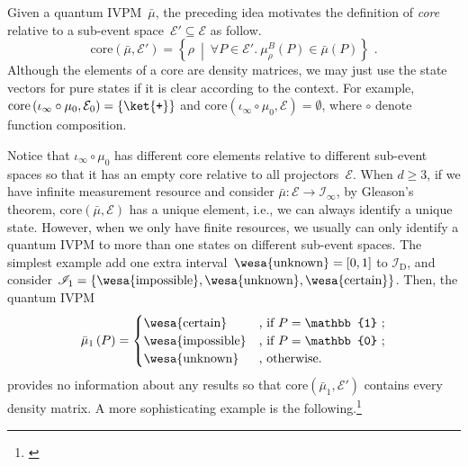 \documentclass[english,reprint, aps, prl,superscriptaddress, showpacs,
showkeys, longbibliography, amsmath, amssymb]{revtex4-1}
\theoremstyle{plain}
\theoremstyle{definition}
\newcommand{\events}{\ensuremath{\mathcal{E}}}
\newcommand{\imposs}{{\text{\wesa{impossible}}}}
\newcommand{\necess}{{\text{\wesa{certain}}}}
\newcommand{\unknown}{{\text{\wesa{unknown}}}}
\newcommand{\ps}{\texttt{+}}
\newcommand{\yutsung}[1]{\begin{framed}\begin{minipage}{0.9\linewidth}\color{purple}{Yu-Tsung says: #1}\end{minipage}\end{framed}}
\newcommand{\set}[2]{\ensuremath{\left\{ {#1}~\middle|~{#2}\right\} }}
\begin{document}
Given a quantum IVPM~$\bar{\mu}$, the preceding idea motivates the
definition of \emph{core} relative to a sub-event space~$\events'\subseteq\events$
as follow.
\begin{equation}
\mathrm{core}\left(\bar{\mu},\events'\right)=\set{\rho}{\forall P\in\events'.~\mu_{\rho}^{B}\left(P\right)\in\bar{\mu}\left(P\right)}\textrm{ .}
\end{equation}
Although the elements of a core are density matrices, we may just
use the state vectors for pure states if it is clear according to
the context. For example, $\mathrm{core}\left(\iota_{\infty}\circ\mu_{0},\events_{0}\right)=\left\{ \ket{\ps}\right\} $
and $\mathrm{core}\left(\iota_{\infty}\circ\mu_{0},\events\right)=\emptyset$,
where $\circ$ denote function composition.

Notice that $\iota_{\infty}\circ\mu_{0}$ has different core elements
relative to different sub-event spaces so that it has an empty core
relative to all projectors~$\events$. When $d\ge3$, if we have
infinite measurement resource and consider $\bar{\mu}:\events\rightarrow\mathscr{I}_{\infty}$,
by Gleason's theorem, $\mathrm{core}\left(\bar{\mu},\events\right)$
has a unique element, i.e., we can always identify a unique state.
However, when we only have finite resources, we usually can only identify
a quantum IVPM to more than one states on different sub-event spaces.
The simplest example add one extra interval~$\unknown=\left[0,1\right]$
to $\mathscr{I}_{\mathrm{D}}$, and consider $\mathscr{I}_{1}=\left\{ \imposs,\unknown,\necess\right\} $.
Then, the quantum IVPM
\begin{equation}
\bar{\mu}_{1}\left(P\right)=\begin{cases}
\necess & \text{, if }P=\mathbb{1}\text{ ;}\\
\imposs & \text{, if }P=\mathbb{0}\text{ ;}\\
\unknown & \text{, otherwise.}
\end{cases}\label{eq:homomorphism-1}
\end{equation}
provides no information about any results so that $\mathrm{core}\left(\bar{\mu}_{1},\events'\right)$
contains every density matrix. A more sophisticating example is the
following.\footnote{\yutsung{It seems that our example in 4 dimensions together with
relativity core would be unnecessary complex. Therefore, I roll our
example back to 3 dimensions.}}
\end{document}

